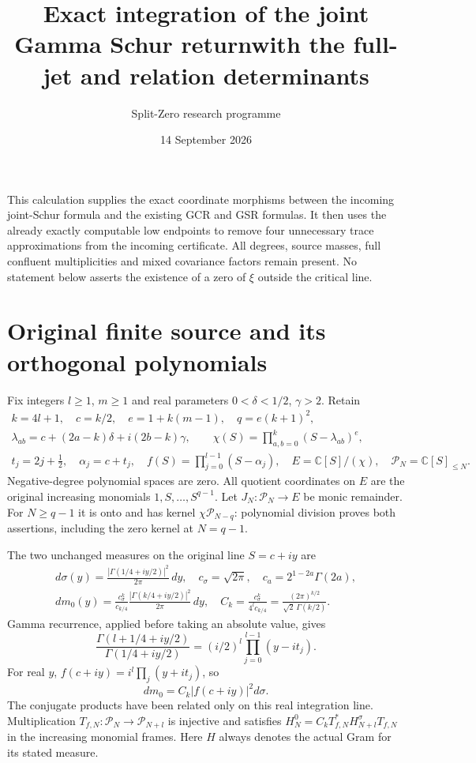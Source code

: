 \documentclass[11pt,a4paper]{article}
\title{Exact integration of the joint Gamma Schur return\newline with the full-jet and relation determinants}
\author{Split-Zero research programme}
\date{14 September 2026}
\newcommand{\C}{\mathbb C}
\newcommand{\Pp}{\mathcal P}
\begin{document}
\maketitle

This calculation supplies the exact coordinate morphisms between the
incoming joint-Schur formula and the existing GCR and GSR formulas.
It then uses the already exactly computable low endpoints to remove
four unnecessary trace approximations from the incoming certificate.
All degrees, source masses, full confluent multiplicities and mixed
covariance factors remain present. No statement below asserts the
existence of a zero of $\xi$ outside the critical line.

\section{Original finite source and its orthogonal polynomials}

Fix integers $l\geq1$, $m\geq1$ and real parameters
$0<\delta<1/2$, $\gamma>2$. Retain
\[
\begin{gathered}
 k=4l+1,\quad c=k/2,\quad e=1+k(m-1),\quad q=e(k+1)^2,\\
 \lambda_{ab}=c+(2a-k)\delta+i(2b-k)\gamma,\qquad
 \chi(S)=\prod_{a,b=0}^k(S-\lambda_{ab})^e,\\
 t_j=2j+\tfrac12,\quad \alpha_j=c+t_j,\quad
 f(S)=\prod_{j=0}^{l-1}(S-\alpha_j),\quad
 E=\C[S]/(\chi),\quad \Pp_N=\C[S]_{\leq N}.
\end{gathered}\tag{JSA1}
\]
Negative-degree polynomial spaces are zero. All quotient coordinates
on $E$ are the original increasing monomials $1,S,\ldots,S^{q-1}$.
Let $J_N:\Pp_N\to E$ be monic remainder. For $N\geq q-1$ it
is onto and has kernel $\chi\Pp_{N-q}$: polynomial division proves
both assertions, including the zero kernel at $N=q-1$.

The two unchanged measures on the original line $S=c+iy$ are
\[
\begin{gathered}
 d\sigma(y)=\frac{|\Gamma(1/4+iy/2)|^2}{2\pi}\,dy,
 \quad c_\sigma=\sqrt{2\pi},\quad c_a=2^{1-2a}\Gamma(2a),\\
 dm_0(y)=\frac{c_\sigma^k}{c_{k/4}}
       \frac{|\Gamma(k/4+iy/2)|^2}{2\pi}\,dy,
 \quad C_k=\frac{c_\sigma^k}{4^l c_{k/4}}
          =\frac{(2\pi)^{k/2}}{\sqrt2\,\Gamma(k/2)}.
\end{gathered}\tag{JSA2}
\]
Gamma recurrence, applied before taking an absolute value, gives
\[
 \frac{\Gamma(l+1/4+iy/2)}{\Gamma(1/4+iy/2)}
  =(i/2)^l\prod_{j=0}^{l-1}(y-it_j).
\]
For real $y$, $f(c+iy)=i^l\prod_j(y+it_j)$, so
\[
 dm_0=C_k|f(c+iy)|^2d\sigma.\tag{JSA3}
\]
The conjugate products have been related only on this real integration
line. Multiplication $T_{f,N}:\Pp_N\to\Pp_{N+l}$ is injective
and satisfies $H_N^0=C_kT_{f,N}^*H_{N+l}^\sigma T_{f,N}$ in
the increasing monomial frames. Here $H$ always denotes the actual
Gram for its stated measure.
\end{document}
